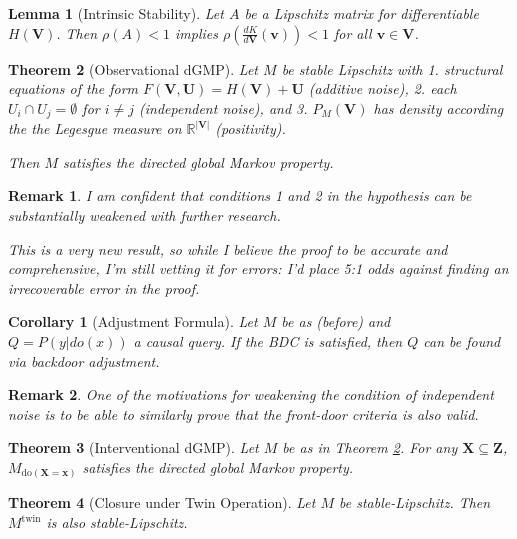 \documentclass{article}
\newtheorem{theorem}{Theorem}
\newtheorem{corollary}{Corollary}
\newtheorem{lemma}[theorem]{Lemma}
\newtheorem{remark}{Remark}
\newcommand\R{\mathbb{R}}
\begin{document}
\begin{lemma}[Intrinsic Stability] \label{intrinsic-stability}
Let $A$ be a Lipschitz matrix for differentiable $H(\mathbf{V})$. Then $\rho(A)<1$ implies $\rho(\frac{dK}{d\mathbf{V}}(\mathbf{v}))<1$ for all $\mathbf{v}\in\mathbf{V}$.
\end{lemma}

\begin{theorem}[Observational dGMP] \label{thrm:obs}
Let $M$ be stable Lipschitz with 1. structural equations of the form $F(\mathbf{V},\mathbf{U})=H(\mathbf{V})+\mathbf{U}$ (additive noise), 2. each $U_i\cap U_j=\emptyset$ for $i\neq j$ (independent noise), and 3. $P_M(\mathbf{V})$ has density according the the Legesgue measure on $\R^{|\mathbf{V}|}$ (positivity). 

Then $M$ satisfies the directed global Markov property.
\end{theorem}

\begin{remark}
I am confident that conditions 1 and 2 in the hypothesis can be substantially weakened with further research.

This is a very new result, so while I believe the proof to be accurate and comprehensive, I'm still vetting it for errors: I'd place 5:1 odds against finding an irrecoverable error in the proof. 
\end{remark}

\begin{corollary}[Adjustment Formula] \label{adjustment}
Let $M$ be as (before) and $Q=P(y|do(x))$ a causal query. If the BDC is satisfied, then $Q$ can be found via backdoor adjustment.
\end{corollary}

\begin{remark}
One of the motivations for weakening the condition of independent noise is to be able to similarly prove that the front-door criteria is also valid.
\end{remark}

\begin{theorem}[Interventional dGMP] \label{thrm:int}
Let $M$ be as in Theorem \ref{thrm:obs}. For any $\mathbf{X}\subseteq \mathbf{Z}$, $M_{\text{do}(\mathbf{X}=\mathbf{x})}$ satisfies the directed global Markov property.
\end{theorem}

\begin{theorem}[Closure under Twin Operation] \label{twin}
Let $M$ be stable-Lipschitz. Then $M^{\text{twin}}$ is also stable-Lipschitz.
\end{theorem}
\end{document}
